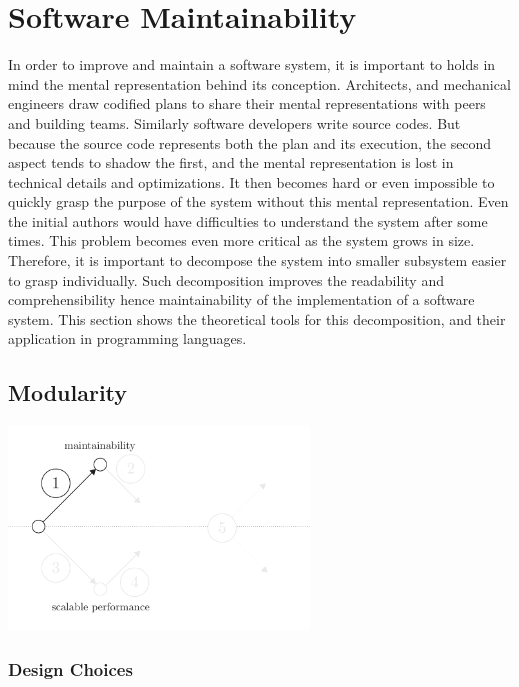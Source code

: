 \section{Software Maintainability} \label{chapter3:software-maintainability}

In order to improve and maintain a software system, it is important to holds in mind the mental representation behind its conception.
Architects, and mechanical engineers draw codified plans to share their mental representations with peers and building teams.
Similarly software developers write source codes.
But because the source code represents both the plan and its execution, the second aspect tends to shadow the first, and the mental representation is lost in technical details and optimizations.
It then becomes hard or even impossible to quickly grasp the purpose of the system without this mental representation.
Even the initial authors would have difficulties to understand the system after some times.
This problem becomes even more critical as the system grows in size.
Therefore, it is important to decompose the system into smaller subsystem easier to grasp individually.
Such decomposition improves the readability and comprehensibility hence maintainability of the implementation of a software system.
This section shows the theoretical tools for this decomposition, and their application in programming languages.


\subsection{Modularity}

\begin{center}
\includegraphics[width=0.6\textwidth]{../ressources/state-of-the-art-1.pdf}
\end{center}

\subsubsection{Design Choices}


